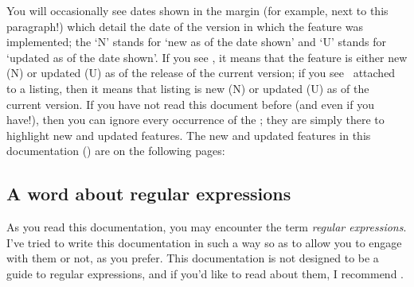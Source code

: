  You will occasionally see dates shown in the margin (for example, next to this
 paragraph!)  which detail the date of the version in which
 the feature was implemented; the `N' stands for `new as of the date shown' and `U' stands
 for `updated as of the date shown'. If you see \stardemo, it means that the feature is
 either new (N) or updated (U) as of the release of the current version; if you see
 \stardemo\, attached to a listing, then it means that listing is new (N) or updated (U)
 as of the current version. If you have not read this document before (and even if you
 have!), then you can ignore every occurrence of the \stardemo; they are simply there to
 highlight new and updated features. The new and updated features in this documentation
 (\gitRel) are on the following pages: \listOfNewFeatures%

\subsection{A word about regular expressions}
 As you read this documentation, you may encounter the term \emph{regular expressions}.
 I've tried to write this documentation in such a way so as to allow you to engage with
 them or not, as you prefer. This documentation is not designed to be a guide to regular
 expressions, and if you'd like to read about them, I recommend \cite{masteringregexp}.
